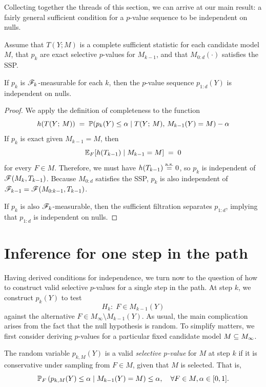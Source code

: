\documentclass{article}
\begin{document}
Collecting together the threads of this section, we can arrive at our main result: a fairly general sufficient condition for a $p$-value sequence to be independent on nulls.
\begin{theorem} \label{thm:suffCond}
Assume that $T(Y; M)$ is a complete sufficient statistic for each candidate model $M$, that $p_k$ are exact selective $p$-values for $M_{k-1}$, and that $M_{0:d}(\cdot)$ satisfies the SSP.

If $p_k$ is $\sF_k$-measurable for each $k$, then the $p$-value sequence $p_{1:d}(Y)$ is independent on nulls.
\end{theorem}

\begin{proof}
We apply the definition of completeness to the function 
\[
h(T(Y; \, M)) \;=\; 
\P(p_k(Y) \leq \alpha \mid T(Y; \, M), \, M_{k-1}(Y) = M) - \alpha
\]
If $p_k$ is exact given $M_{k-1} = M$, then 
\[
\E_F[h(T_{k-1}) \mid M_{k-1}=M] \;=\; 0
\] 
for every $F\in M$. Therefore, we must have $h(T_{k-1})\eqAS 0$, so $p_k$ is independent of $\sF(M_k, T_{k-1})$. Because $M_{0:d}$ satisfies the SSP, $p_k$ is also independent of $\sF_{k-1} = \sF(M_{0:k-1}, T_{k-1})$.

If $p_k$ is also $\sF_k$-measurable, then the sufficient filtration separates $p_{1:d}$, implying that $p_{1:d}$ is independent on nulls.
\end{proof}

\section{Inference for one step in the path}
\label{sec:singleStep}

Having derived conditions for independence, we turn now to the question of how to construct valid selective $p$-values for a single step in the path. At step $k$, we construct $p_k(Y)$ to test
\[
  H_{k}:\; F \in M_{k-1}(Y)
\]
against the alternative $F \in M_\infty \setminus M_{k-1}(Y)$. As usual, the main complication arises from the fact that the null hypothesis is random. To simplify matters, we first consider deriving $p$-values for a particular fixed candidate model $M\sub M_{\infty}$.

The random variable  $p_{k,M}(Y)$ is a valid {\em selective $p$-value} for $M$ at step $k$ if it is conservative under sampling from $F\in M$, given that $M$ is selected. That is,
\[
\P_F\left(p_{k,M}(Y) \leq \alpha \mid M_{k-1}(Y) = M\right) 
\leq \alpha, \quad \forall F\in M, \alpha \in [0,1].
\]
\end{document}
